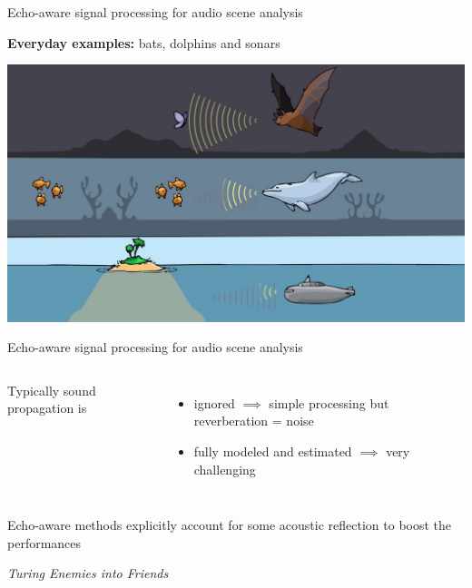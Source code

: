 \begin{frame}[t]{\alert{Echo-aware} signal processing for audio scene analysis}

    \textbf{Everyday examples:} bats, dolphins and sonars

    \begin{center}
        \includegraphics[width=\textwidth]{figures/echo_nature.jpg}
    \end{center}

\end{frame}

\begin{frame}[t]{\alert{Echo-aware} signal processing for audio scene analysis}


    \begin{columns}
        Typically sound propagation is
        \begin{itemize}
            \item ignored $\implies$ simple processing but reverberation = noise
            \item fully modeled and estimated $\implies$ very challenging
        \end{itemize}

    \end{columns}

    \begin{mydefblock}{Echo-aware methods}
        explicitly account for some acoustic reflection to boost the performances
        \begin{center}
            \textit{Turing Enemies into Friends}
        \end{center}
        \hfill \cite{ribeiro2010turning}
    \end{mydefblock}



\end{frame}

